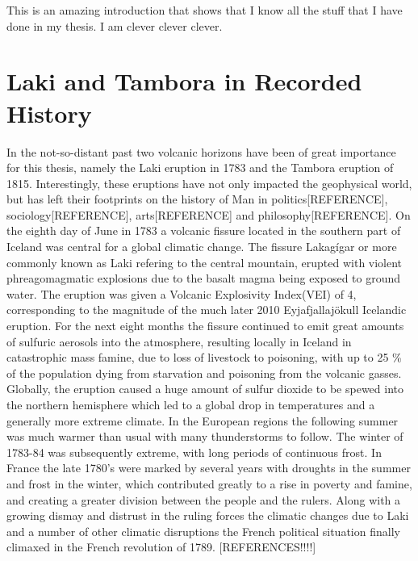 \documentclass[../../CompleteThesis/Complete_1stDraft]{subfiles}
\begin{document}
This is an amazing introduction that shows that I know all the stuff that I have done in my thesis. I am clever clever clever.

\section[Laki and Tambora]{Laki and Tambora in Recorded History}

In the not-so-distant past two volcanic horizons have been of great importance for this thesis, namely the Laki eruption in 1783 and the Tambora eruption of 1815. Interestingly, these eruptions have not only impacted the geophysical world, but has left their footprints on the history of Man in politics[REFERENCE], sociology[REFERENCE], arts[REFERENCE] and philosophy[REFERENCE]. On the eighth day of June in 1783 a volcanic fissure located in the southern part of Iceland was central for a global climatic change. The fissure Lakagígar or more commonly known as Laki refering to the central mountain, erupted with violent phreagomagmatic explosions due to the basalt magma being exposed to ground water. The eruption was given a Volcanic Explosivity Index(VEI) of 4, corresponding to the magnitude of the much later 2010 Eyjafjallajökull Icelandic eruption. For the next eight months the fissure continued to emit great amounts of sulfuric aerosols into the atmosphere, resulting locally in Iceland in catastrophic mass famine, due to loss of livestock to poisoning, with up to 25 \% of the population dying from starvation and poisoning from the volcanic gasses. Globally, the eruption caused a huge amount of sulfur dioxide to be spewed into the northern hemisphere which led to a global drop in temperatures and a generally more extreme climate. In the European regions the following summer was much warmer than usual with many thunderstorms to follow. The winter of 1783-84 was subsequently extreme, with long periods of continuous frost. In France the late 1780's were marked by several years with droughts in the summer and frost in the winter, which contributed greatly to a rise in poverty and famine, and creating a greater division between the people and the rulers. Along with a growing dismay and distrust in the ruling forces the climatic changes due to Laki and a number of other climatic disruptions the French political situation finally climaxed in the French revolution of 1789. [REFERENCES!!!!]\\
\end{document}
